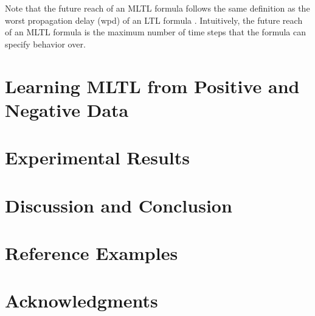 \documentclass[letterpaper]{article} %
\begin{document}
Note that the future reach of an MLTL formula follows the same definition as the worst propagation delay (wpd) of an LTL formula \cite{KZJZR20}. 
Intuitively, the future reach of an MLTL formula is the maximum number of time steps that the formula can specify behavior over.


\section{Learning MLTL from Positive and Negative Data}


\section{Experimental Results}


\section{Discussion and Conclusion}


\appendix
\section{Reference Examples}
\label{sec:reference_examples}

\section{Acknowledgments}



\end{document}

